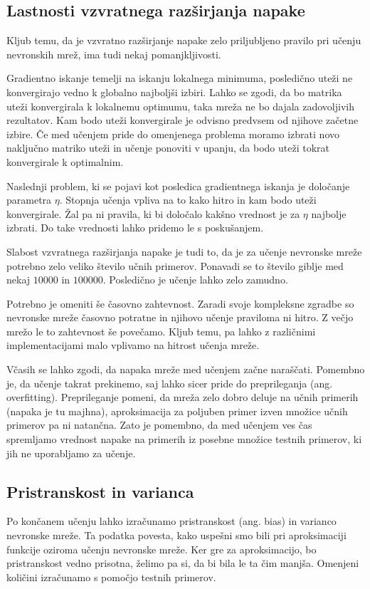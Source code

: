 \documentclass[mat1]{fmfdelo}
\begin{document}
\subsection{Lastnosti vzvratnega razširjanja napake}
Kljub temu, da je vzvratno razširjanje napake zelo priljubljeno pravilo pri učenju nevronskih mrež, ima tudi nekaj pomanjkljivosti. 

Gradientno iskanje temelji na iskanju lokalnega minimuma, posledično uteži ne konvergirajo vedno k globalno najboljši izbiri. Lahko se zgodi, da bo matrika uteži konvergirala k lokalnemu optimumu, taka mreža ne bo dajala zadovoljivih rezultatov. Kam bodo uteži konvergirale je odvisno predvsem od njihove začetne izbire. Če med učenjem pride do omenjenega problema moramo izbrati novo naključno matriko uteži in učenje ponoviti v upanju, da bodo uteži tokrat konvergirale k optimalnim.

Naslednji problem, ki se pojavi kot posledica gradientnega iskanja je določanje parametra $\eta$. Stopnja učenja vpliva na to kako hitro in kam bodo uteži konvergirale. Žal pa ni pravila, ki bi določalo kakšno vrednost je za $\eta$ najbolje izbrati. Do take vrednosti lahko pridemo le s poskušanjem.

Slabost vzvratnega razširjanja napake je tudi to, da je za učenje nevronske mreže potrebno zelo veliko število učnih primerov. Ponavadi se to število giblje med nekaj $10000$ in $100000$. Posledično je učenje lahko zelo zamudno.

Potrebno je omeniti še časovno zahtevnost. Zaradi svoje kompleksne zgradbe so nevronske mreže časovno potratne in njihovo učenje praviloma ni hitro. Z večjo mrežo le to zahtevnost še povečamo. Kljub temu, pa lahko z različnimi implementacijami malo vplivamo na hitrost učenja mreže.

Včasih se lahko zgodi, da napaka mreže med učenjem začne naraščati. Pomembno je, da učenje takrat prekinemo, saj lahko sicer pride do preprileganja (ang. overfitting). Preprileganje pomeni, da mreža zelo dobro deluje na učnih primerih (napaka je tu majhna), aproksimacija za poljuben primer izven množice učnih primerov pa ni natančna. Zato je pomembno, da med učenjem ves čas spremljamo vrednost napake na primerih iz posebne množice testnih primerov, ki jih ne uporabljamo za učenje.
%
\subsection{Pristranskost in varianca}
Po končanem učenju lahko izračunamo pristranskost (ang. bias) in varianco nevronske mreže. Ta podatka povesta, kako uspešni smo bili pri aproksimaciji funkcije oziroma učenju nevronske mreže. Ker gre za aproksimacijo, bo pristranskost vedno prisotna, želimo pa si, da bi bila le ta čim manjša. Omenjeni količini izračunamo s pomočjo testnih primerov.
\end{document}
